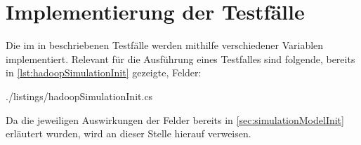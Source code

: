 \section{Implementierung der Testfälle}\label{sec:implTestcases}

Die im in  beschriebenen Testfälle werden mithilfe verschiedener Variablen implementiert.
Relevant für die Ausführung eines Testfalles sind folgende, bereits in \autoref{lst:hadoopSimulationInit} gezeigte, Felder:


{./listings/hadoopSimulationInit.cs}

Da die jeweiligen Auswirkungen der Felder bereits in \autoref{sec:simulationModelInit} erläutert wurden, wird an dieser Stelle hierauf verweisen.
